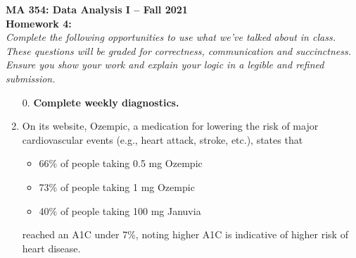 \documentclass{article}\usepackage[]{graphicx}\usepackage[]{color}
\begin{document}
\noindent \textbf{MA 354: Data Analysis I -- Fall 2021}\\%
\noindent \textbf{Homework 4:}\vspace{1em}\\
\emph{Complete the following opportunities to use what we've talked about in class. 
These questions will be graded for correctness, communication and succinctness. 
Ensure you show your work and explain your logic in a legible and refined submission.}
\begin{enumerate}
\item[0.] \textbf{Complete weekly diagnostics.}
  
\item On its website, Ozempic, a medication for lowering the risk of major cardiovascular 
events (e.g., heart attack, stroke, etc.), states that 
\begin{itemize}
  \item 66\% of people taking 0.5 mg Ozempic
  \item 73\% of people taking 1 mg Ozempic
  \item 40\% of people taking 100 mg Januvia
\end{itemize}
reached an A1C under 7\%, noting higher A1C is indicative of higher risk of heart disease.


\end{enumerate}
\end{document}
